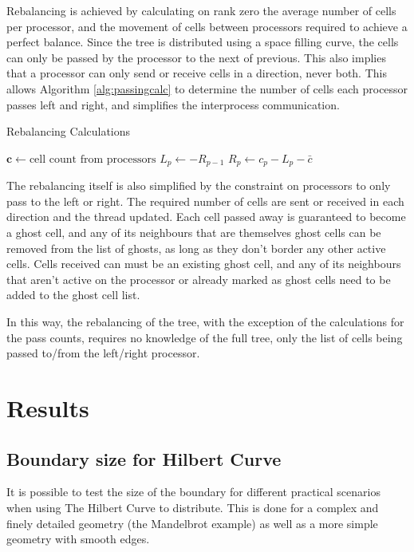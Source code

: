 \documentclass{IIBproject}
\newcommand{\vect}[1]{\bm{#1}}
\begin{document}
Rebalancing is achieved by calculating on rank zero the average number of cells per processor, and the movement of cells between processors required to achieve a perfect balance. Since the tree is distributed using a space filling curve, the cells can only be passed by the processor to the next of previous. This also implies that a processor can only send or receive cells in a direction, never both. This allows Algorithm \ref{alg:passingcalc} to determine the number of cells each processor passes left and right, and simplifies the interprocess communication.

\begin{algorithm}
\begin{algorithmic}
\caption{Rebalancing Calculations}
\label{alg:passingcalc}

	\State $\vect{c} \gets \text{cell count from processors}$
		\State $L_p \gets -R_{p-1}$
		\State $R_p \gets c_p - L_p - \bar{c}$
	\EndFor
\EndFunction

\end{algorithmic}
\end{algorithm}

The rebalancing itself is also simplified by the constraint on processors to only pass to the left or right. The required number of cells are sent or received in each direction and the thread updated. Each cell passed away is guaranteed to become a ghost cell, and any of its neighbours that are themselves ghost cells can be removed from the list of ghosts, as long as they don't border any other active cells. Cells received can must be an existing ghost cell, and any of its neighbours that aren't active on the processor or already marked as ghost cells need to be added to the ghost cell list.

In this way, the rebalancing of the tree, with the exception of the calculations for the pass counts, requires no knowledge of the full tree, only the list of cells being passed to/from the left/right processor. 


\section{Results}

\subsection{Boundary size for Hilbert Curve}

It is possible to test the size of the boundary for different practical scenarios when using The Hilbert Curve to distribute. This is done for a complex and finely detailed geometry (the Mandelbrot example) as well as a more simple geometry with smooth edges. 
\end{document}
